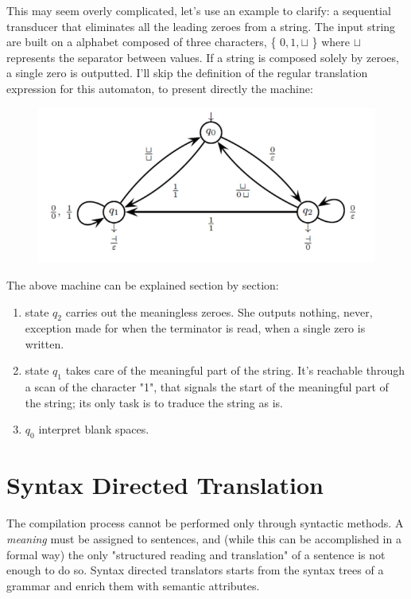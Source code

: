 					This may seem overly complicated, let's use an example to clarify: a sequential transducer that eliminates all the leading zeroes from a 
					string. The input string are built on a alphabet composed of three characters, \{ $0, 1, \sqcup$ \} where $\sqcup$ represents the separator 
					between values. If a string is composed solely by zeroes, a single zero is outputted.
					I'll skip the definition of the regular translation expression for this automaton, to present directly the machine:
					\begin{figure}[H]
						\centering
						\includegraphics[width = \textwidth]{./images/SeqTrans.png}
					\end{figure}
					The above machine can be explained section by section:
					\begin{enumerate}
						\item state $q_2$ carries out the meaningless zeroes. She outputs nothing, never, exception made for when the terminator is read, when a 
						single zero is written. 
						\item state $q_1$ takes care of the meaningful part of the string. It's reachable through a scan of the character "1", that signals the start 
						of the meaningful part of the string; its only task is to traduce the string as is.
						\item $q_0$ interpret blank spaces. 
					\end{enumerate}
					
	\section{Syntax Directed Translation}
	
		The compilation process cannot be performed only through syntactic methods. A \emph{meaning} must be assigned to sentences, and (while this can be 
		accomplished in a formal way) the only "structured reading and translation" of a sentence is not enough to do so. Syntax directed translators starts from the 
		syntax trees of a grammar and enrich them with semantic attributes. 
		
